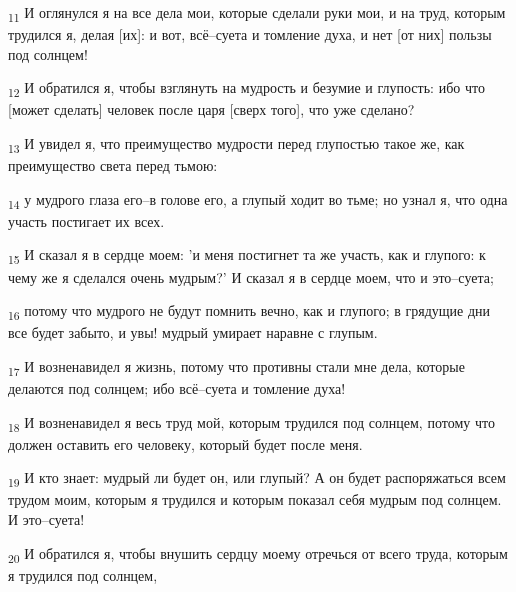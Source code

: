 \begin{tcolorbox}
\textsubscript{11} И оглянулся я на все дела мои, которые сделали руки мои, и на труд, которым трудился я, делая [их]: и вот, всё--суета и томление духа, и нет [от них] пользы под солнцем!
\end{tcolorbox}
\begin{tcolorbox}
\textsubscript{12} И обратился я, чтобы взглянуть на мудрость и безумие и глупость: ибо что [может сделать] человек после царя [сверх того], что уже сделано?
\end{tcolorbox}
\begin{tcolorbox}
\textsubscript{13} И увидел я, что преимущество мудрости перед глупостью такое же, как преимущество света перед тьмою:
\end{tcolorbox}
\begin{tcolorbox}
\textsubscript{14} у мудрого глаза его--в голове его, а глупый ходит во тьме; но узнал я, что одна участь постигает их всех.
\end{tcolorbox}
\begin{tcolorbox}
\textsubscript{15} И сказал я в сердце моем: 'и меня постигнет та же участь, как и глупого: к чему же я сделался очень мудрым?' И сказал я в сердце моем, что и это--суета;
\end{tcolorbox}
\begin{tcolorbox}
\textsubscript{16} потому что мудрого не будут помнить вечно, как и глупого; в грядущие дни все будет забыто, и увы! мудрый умирает наравне с глупым.
\end{tcolorbox}
\begin{tcolorbox}
\textsubscript{17} И возненавидел я жизнь, потому что противны стали мне дела, которые делаются под солнцем; ибо всё--суета и томление духа!
\end{tcolorbox}
\begin{tcolorbox}
\textsubscript{18} И возненавидел я весь труд мой, которым трудился под солнцем, потому что должен оставить его человеку, который будет после меня.
\end{tcolorbox}
\begin{tcolorbox}
\textsubscript{19} И кто знает: мудрый ли будет он, или глупый? А он будет распоряжаться всем трудом моим, которым я трудился и которым показал себя мудрым под солнцем. И это--суета!
\end{tcolorbox}
\begin{tcolorbox}
\textsubscript{20} И обратился я, чтобы внушить сердцу моему отречься от всего труда, которым я трудился под солнцем,
\end{tcolorbox}
